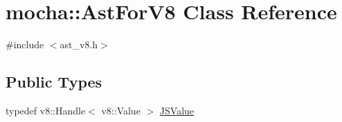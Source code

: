 \hypertarget{classmocha_1_1_ast_for_v8}{
\section{mocha::AstForV8 Class Reference}
\label{classmocha_1_1_ast_for_v8}
}


{\ttfamily \#include $<$ast\_\-v8.h$>$}

\subsection*{Public Types}
\begin{DoxyCompactItemize}
\item 
typedef v8::Handle$<$ v8::Value $>$ \hyperlink{classmocha_1_1_ast_for_v8_af0e3f6f88e017315384842e6e8c20c9d}{JSValue}
\end{DoxyCompactItemize}
